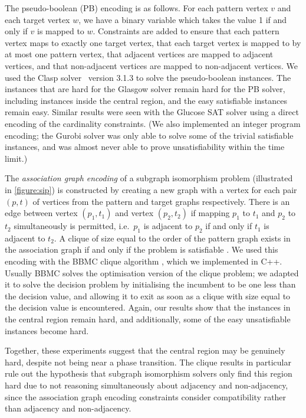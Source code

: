 \documentclass[twoside,11pt]{article}
\newcommand{\citep}[1]{\cite{#1}}
\begin{document}
The pseudo-boolean (PB) encoding is as follows. For each pattern vertex $v$ and each target vertex
$w$, we have a binary variable which takes the value 1 if and only if $v$ is mapped to $w$.
Constraints are added to ensure that each pattern vertex maps to exactly one target vertex, that
each target vertex is mapped to by at most one pattern vertex, that adjacent vertices are mapped to
adjacent vertices, and that non-adjacent vertices are mapped to non-adjacent vertices. We used the
Clasp solver~\citep{gekakaosscsc11a} version 3.1.3 to solve the pseudo-boolean instances.  The
instances that are hard for the Glasgow solver remain hard for the PB solver, including instances
inside the central region, and the easy satisfiable instances remain easy. Similar results were
seen with the Glucose SAT solver \cite{glucose} using a direct encoding of the cardinality constraints. (We also
implemented an integer program encoding; the Gurobi solver was only able to solve some of the
trivial satisfiable instances, and was almost never able to prove unsatisfiability within the time
limit.)

The \emph{association graph encoding} of a subgraph isomorphism problem (illustrated in
\cref{figure:sip}) is constructed by creating a new graph with a vertex for each pair $(p, t)$ of
vertices from the pattern and target graphs respectively. There is an edge between vertex $(p_1,
t_1)$ and vertex $(p_2, t_2)$ if mapping $p_1$ to $t_1$ and $p_2$ to $t_2$ simultaneously is
permitted, i.e.\ $p_1$ is adjacent to $p_2$ if and only if $t_1$ is adjacent to $t_2$. A clique of
size equal to the order of the pattern graph exists in the association graph if and only if the
problem is satisfiable \citep{Levi:1973}. We used this encoding with the BBMC clique algorithm
\citep{SanSegundo:2011}, which we implemented in C++. Usually BBMC solves the optimisation version
of the clique problem; we adapted it to solve the decision problem by initialising the incumbent to
be one less than the decision value, and allowing it to exit as soon as a clique with size equal to
the decision value is encountered.  Again, our results show that the instances in the central region
remain hard, and additionally, some of the easy unsatisfiable instances become hard.

Together, these experiments suggest that the central region may be genuinely hard, despite not being
near a phase transition. The clique results in particular rule out the hypothesis that subgraph
isomorphism solvers only find this region hard due to not reasoning simultaneously about adjacency
and non-adjacency, since the association graph encoding constraints consider compatibility rather
than adjacency and non-adjacency.
\end{document}
